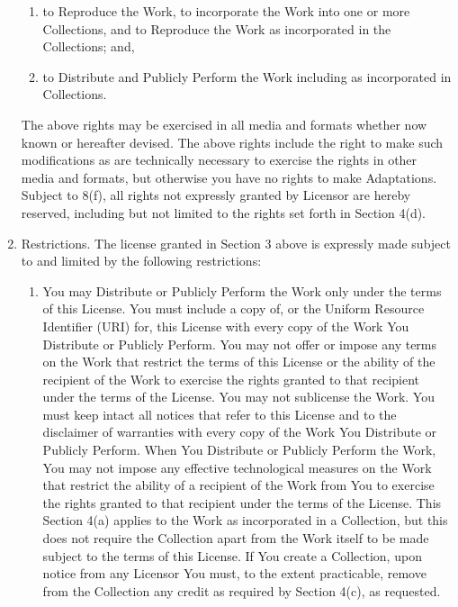 \begin{enumerate}
        \begin{enumerate}
        
            \item to Reproduce the Work, to incorporate the Work into one or
                more Collections, and to Reproduce the Work as incorporated in
                the Collections; and, 
    
            \item to Distribute and Publicly Perform the Work including as
                incorporated in Collections.

        \end{enumerate}

The above rights may be exercised in all media and formats whether now known or
hereafter devised. The above rights include the right to make such
modifications as are technically necessary to exercise the rights in other
media and formats, but otherwise you have no rights to make Adaptations.
Subject to 8(f), all rights not expressly granted by Licensor are hereby
reserved, including but not limited to the rights set forth in Section 4(d).

    \item Restrictions. The license granted in Section 3 above is expressly
        made subject to and limited by the following restrictions:

        \begin{enumerate}

            \item You may Distribute or Publicly Perform the Work only under
                the terms of this License. You must include a copy of, or the
                Uniform Resource Identifier (URI) for, this License with every
                copy of the Work You Distribute or Publicly Perform. You may
                not offer or impose any terms on the Work that restrict the
                terms of this License or the ability of the recipient of the
                Work to exercise the rights granted to that recipient under the
                terms of the License. You may not sublicense the Work. You must
                keep intact all notices that refer to this License and to the
                disclaimer of warranties with every copy of the Work You
                Distribute or Publicly Perform. When You Distribute or Publicly
                Perform the Work, You may not impose any effective
                technological measures on the Work that restrict the ability of
                a recipient of the Work from You to exercise the rights granted
                to that recipient under the terms of the License. This Section
                4(a) applies to the Work as incorporated in a Collection, but
                this does not require the Collection apart from the Work itself
                to be made subject to the terms of this License. If You create
                a Collection, upon notice from any Licensor You must, to the
                extent practicable, remove from the Collection any credit as
                required by Section 4(c), as requested.
            

\end{enumerate}
\end{enumerate}
